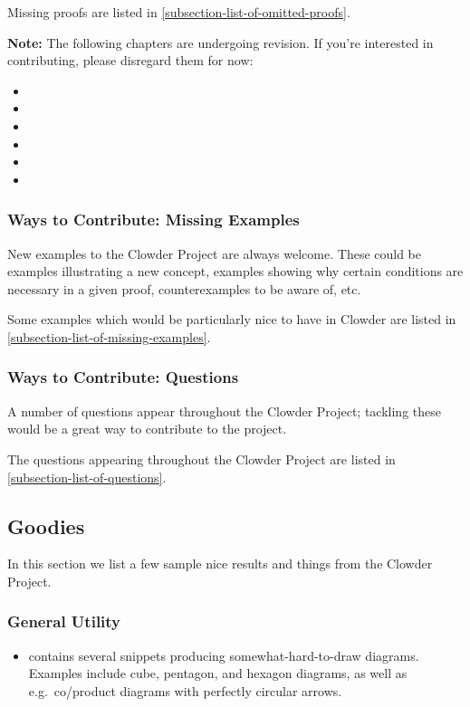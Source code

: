 Missing proofs are listed in \cref{subsection-list-of-omitted-proofs}.

\textbf{Note: }The following chapters are undergoing revision. If you're interested in contributing, please disregard them for now:
\begin{itemize}
    \item \ChapterRelations
    \item \ChapterConstructionsWithRelations
    \item \ChapterConditionsOnRelations
    \item \ChapterCategories
    \item \ChapterConstructionsWithMonoidalCategories
    \item \ChapterTypesOfMorphismsInBicategories
\end{itemize}
\subsubsection{Ways to Contribute: Missing Examples}\label{subsubsection-ways-to-contribute-missing-examples}
New examples to the Clowder Project are always welcome. These could be examples illustrating a new concept, examples showing why certain conditions are necessary in a given proof, counterexamples to be aware of, etc.

Some examples which would be particularly nice to have in Clowder are listed in \cref{subsection-list-of-missing-examples}.
\subsubsection{Ways to Contribute: Questions}\label{subsubsection-ways-to-contribute-questions}
A number of questions appear throughout the Clowder Project; tackling these would be a great way to contribute to the project.

The questions appearing throughout the Clowder Project are listed in \cref{subsection-list-of-questions}.
\subsection{Goodies}\label{subsection-goodies}
In this section we list a few sample nice results and things from the Clowder Project.
\subsubsection{General Utility}\label{subsubsection-goodies-general-utility}
\begin{itemize}
    \item {} contains several  snippets producing somewhat-hard-to-draw diagrams. Examples include cube, pentagon, and hexagon diagrams, as well as e.g.\ co/product diagrams with perfectly circular arrows.
\end{itemize}
